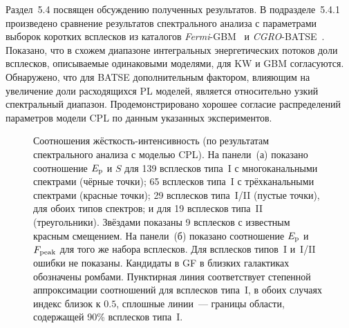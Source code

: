 Раздел~5.4 посвящен обсуждению полученных результатов.
В подразделе~5.4.1 произведено сравнение результатов спектрального анализа 
с параметрами выборок коротких всплесков из каталогов \textit{Fermi}-GBM~\citep{Gruber_2014ApJS} 
и \textit{CGRO}-BATSE~\citep{Goldstein_2013ApJS}. 
Показано, что в схожем диапазоне интегральных энергетических потоков доли всплесков, 
описываемые одинаковыми моделями, для KW и GBM согласуются. Обнаружено, что для BATSE 
дополнительным фактором, влияющим на увеличение доли расходящихся PL моделей, 
является относительно узкий спектральный диапазон.
Продемонстрировано хорошее согласие распределений параметров модели CPL 
по данным указанных экспериментов. 

\begin{figure}[h!]
    \begin{minipage}[h]{0.5\textwidth}
    \end{minipage}
    \hfill
    \begin{minipage}[h]{0.5\textwidth}
	\end{minipage}
    
\caption{\small
    Соотношения жёсткость-интенсивность (по результатам спектрального анализа с моделью CPL).
    На панели~(а) показано соотношение $E_{\mathrm{p}}$ и $S$ для 139
    всплесков типа~I с многоканальными спектрами (чёрные точки); 
    65 всплесков типа~I с трёхканальными спектрами (красные точки); 
    29 всплесков типа~I/II (пустые точки), для обоих типов спектров;
    и для 19 всплесков типа~II (треугольники). Звёздами показаны 9 всплесков с известным красным смещением.
    На панели~(б) показано соотношение $E_{\mathrm{p}}$ и $F_{\mathrm{peak}}$ 
    для того же набора всплесков. Для всплесков типов~I и~I/II ошибки не показаны.
    Кандидаты в GF в близких галактиках обозначены ромбами. 
    Пунктирная линия соответствует степенной аппроксимации соотношений для всплесков типа~I,
    в обоих случаях индекс близок к $0.5$, сплошные линии~--- границы области, содержащей 90\% всплесков типа~I.
    \label{img:EpvsFPandFL}}
\end{figure}

